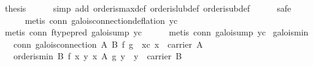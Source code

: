 \begin{isabellebody}
\ {}thesis\isanewline
\ \ \ \ \isamarkupfalse%
\ {}simp\ add{}\ order{}is{}max{}def\ order{}is{}lub{}def\ order{}is{}ub{}def{}\isanewline
\ \ \ \ \isamarkupfalse%
\ safe\isanewline
\ \ \ \ \isamarkupfalse%
\ {}metis\ conn\ galois{}connection{}deflation\ yc{}\isanewline
\ \ \ \ \isamarkupfalse%
\ {}metis\ conn\ ftype{}pred\ galois{}ump{}\ yc{}\isanewline
\ \ \ \ \isamarkupfalse%
\ {}metis\ conn\ galois{}ump{}\ yc{}\isanewline
{}\isamarkupfalse%
%
\endisatagproof
{\isafoldproof}%
%
\isadelimproof
\isanewline
%
\endisadelimproof
\isanewline
{}\isamarkupfalse%
\ galois{}min{}\isanewline
\ \ \ conn{}\ {}galois{}connection\ A\ B\ f\ g{}\ \ xc{}\ {}x\ {}\ carrier\ A{}\isanewline
\ \ \ {}order{}is{}min\ B\ {}f\ x{}\ {}y{}\ x\ {}\isactrlbsub A\ \isactrlesub g\ y\ {}\ y\ {}\ carrier\ B{}{}\isanewline

\end{isabellebody}
